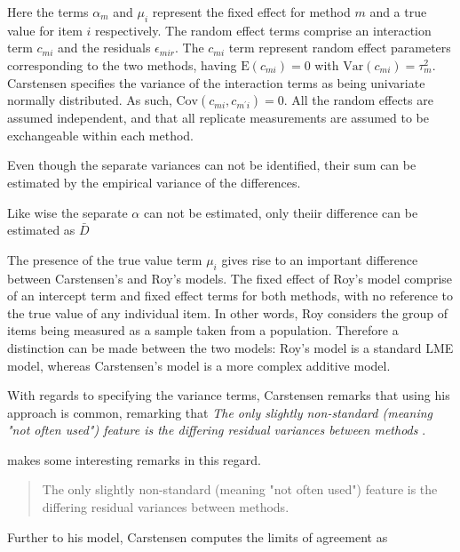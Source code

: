 \documentclass[12pt, a4paper]{report}
\theoremstyle{plain}
\theoremstyle{definition}
\theoremstyle{remark}
\begin{document}
Here the terms $\alpha_{m}$ and $\mu_{i}$ represent the fixed effect for method $m$ and a true value for item $i$ respectively. The random effect terms comprise an interaction term $c_{mi}$ and the residuals $\epsilon_{mir}$.
The $c_{mi}$ term represent random effect parameters corresponding to the two methods, having $\mathrm{E}(c_{mi})=0$ with $\mathrm{Var}(c_{mi})=\tau^2_m$. Carstensen specifies the variance of the interaction terms as being univariate normally distributed. As such, $\mathrm{Cov}(c_{mi}, c_{m^\prime i})= 0.$ All the random effects are assumed independent, and that all replicate measurements are assumed to be exchangeable within each method.


Even though the separate variances can not be
identified, their sum can be estimated by the empirical variance of the differences.

Like wise the separate $\alpha$ can not be
estimated, only theiir difference can be estimated as
$\bar{D}$



The presence of the true value term $\mu_i$ gives rise to an important difference between Carstensen's and Roy's models. The fixed effect of Roy's model comprise of an intercept term and fixed effect terms for both methods, with no reference to the true value of any individual item. In other words, Roy considers the group of items being measured as a sample taken from a population. Therefore a distinction can be made between the two models: Roy's model is a standard LME model, whereas Carstensen's model is a more complex additive model.



With regards to specifying the variance terms, Carstensen remarks that using his approach is common, remarking that \emph{
	The only slightly non-standard (meaning "not often used") feature is the differing residual variances between methods }\citep{bxc2010}.

\citet{BXC2008} makes some interesting remarks in this regard.

\begin{quote}
	The only slightly non-standard (meaning "not often used") feature
	is the differing residual variances between methods.
\end{quote}

Further to his model, Carstensen computes the limits of agreement
as
\end{document}
